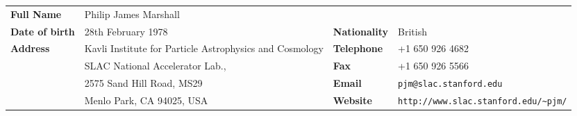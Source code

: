 \begin{raggedright}
\begin{tabular}{@{}p{2.3cm}p{6.0cm}p{2.0cm}p{5.2cm}}
\textbf{Full Name}      & Philip James Marshall           & & \\
\textbf{Date of birth}  & 28th February 1978              & \textbf{Nationality}  & British \\
\textbf{Address}        & Kavli Institute for Particle Astrophysics and Cosmology            & \textbf{Telephone} & +1 650 926 4682 \\
                        & SLAC National Accelerator Lab., & \textbf{Fax}       & +1 650 926 5566 \\
                        & 2575 Sand Hill Road, MS29       & \textbf{Email}     & \texttt{pjm@slac.stanford.edu} \\
                        & Menlo Park, CA 94025, USA       & \textbf{Website}   & \verb+http://www.slac.stanford.edu/~pjm/+
\end{tabular}
\end{raggedright}
